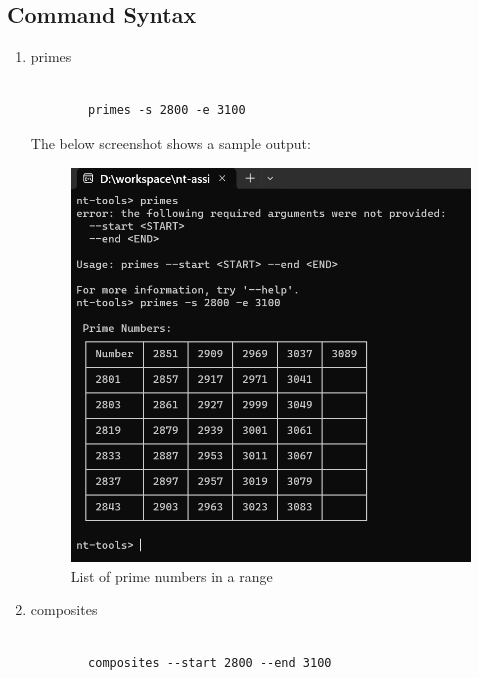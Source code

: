 \documentclass{article}
\begin{document}
    \subsection*{Command Syntax}
    \begin{enumerate}
        \item primes
        \begin{lstlisting}[style=DOS]

        primes -s 2800 -e 3100
        \end{lstlisting}

        The below screenshot shows a sample output:
        \begin{figure}[H]
            \centering
            \includegraphics[scale=0.4]{list_primes.png}
            \caption{List of prime numbers in a range}
        \end{figure}

        \item composites
        \begin{lstlisting}[style=DOS]

        composites --start 2800 --end 3100
        \end{lstlisting}


\end{enumerate}
\end{document}
